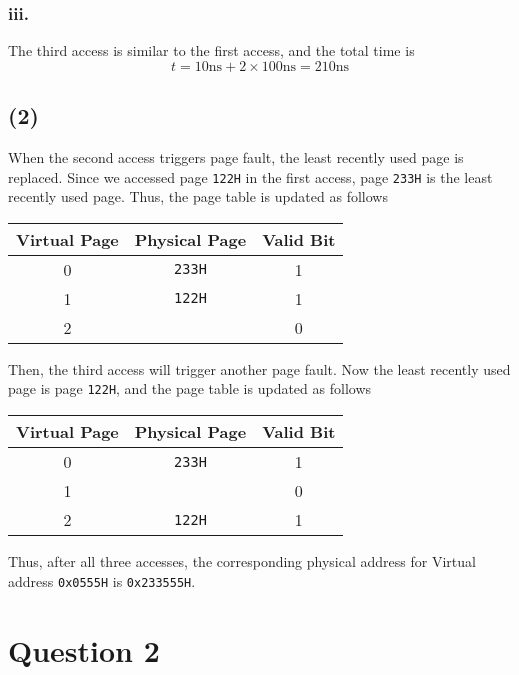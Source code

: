 \documentclass[a4paper,12pt]{article}
\begin{document}
\subsubsection*{iii.}

The third access is similar to the first access, and the total time is
\begin{equation*}
	t = 10 \text{ns} + 2 \times 100 \text{ns} = 210 \text{ns}
\end{equation*}

\subsection*{(2)}

When the second access triggers page fault, the least recently used page is replaced. Since we accessed page \texttt{122H} in the first access, page \texttt{233H} is the least recently used page. Thus, the page table is updated as follows
\begin{table}[H]
	\centering
	\begin{tabular}{ccc}
		\toprule
		Virtual Page & Physical Page & Valid Bit \\
		\midrule
		0 & \texttt{233H} & 1 \\
		1 & \texttt{122H} & 1 \\
		2 & & 0 \\
		\bottomrule
	\end{tabular}
\end{table}

Then, the third access will trigger another page fault. Now the least recently used page is page \texttt{122H}, and the page table is updated as follows
\begin{table}[H]
	\centering
	\begin{tabular}{ccc}
		\toprule
		Virtual Page & Physical Page & Valid Bit \\
		\midrule
		0 & \texttt{233H} & 1 \\
		1 & & 0 \\
		2 & \texttt{122H} & 1 \\
		\bottomrule
	\end{tabular}
\end{table}

Thus, after all three accesses, the corresponding physical address for Virtual address \texttt{0x0555H} is \texttt{0x233555H}.

\section*{Question 2}
\end{document}
